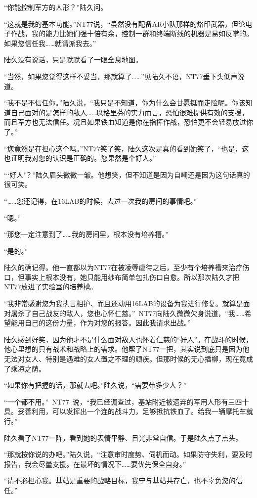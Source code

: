 “你能控制军方的人形？”陆久问。

“这就是我的基本功能。”NT77说，“虽然没有配备AR小队那样的烙印武器，但论电子作战，我的能力比她们强十倍有余，控制一群和终端断线的机器是易如反掌的。如果您信任我……就请派我去。”

陆久没有说话，只是默默看了一眼全息地图。

“当然，如果您觉得这样不妥当，那就算了……”见陆久不语，NT77垂下头低声说道。

“我不是不信任你。”陆久说，“我只是不知道，你为什么会甘愿铤而走险呢。你该知道自己面对的是怎样的敌人……以格里芬的实力而言，恐怕很难提供有效的支援，而且军方也无法信任。况且如果铁血知道是你在指挥作战，恐怕更不会轻易放过你了。”

“您竟然是在担心这个吗。”NT77笑了笑，陆久这次是真的看到她笑了，“也是，这也证明我对您的认识是正确的。您果然是个好人。”

“‘好人’？”陆久眉头微微一皱。他想笑，但不知道是因为自嘲还是因为这句话真的很可笑。

“……您还记得，在16LAB的时候，去过一次我的房间的事情吧。”

“嗯。”

“那您一定注意到了……我的房间里，根本没有培养槽。”

“是的。”

陆久的确记得。他一直都以为NT77在被凌辱虐待之后，至少有个培养槽来治疗伤口，但事实上根本没有，她只能用纱布简单包扎伤口自愈。所以那次陆久才把NT77放进了实验室的培养槽。

“我非常感谢您为我执言相护、而且还动用16LAB的设备为我进行修复。就算是面对屠杀了自己战友的敌人，您也心怀仁慈。” NT77向陆久微微欠身说道，“我……希望能用自己的这份力量，作为对您的报答。因此我请求出战。”

陆久感到好笑，因为他才不是什么面对敌人也怀着仁慈的“好人”。在战斗的时候，他心里想的只有战术和战略上的需求。他帮了NT77一把，其实说到底只是因为他无法对女人、特别是遇难的女人置之不理的顽疾。但那时候的无心插柳，现在竟成了乘凉之荫。

“如果你有把握的话，那就去吧。”陆久说，“需要带多少人？”

“一个都不用。” NT77 说，“我已经调查过，基站附近被遗弃的军用人形有三四十具。妥善利用，可以发挥出一个连的战斗力，足够抵抗铁血了。给我一辆摩托车就行。”

陆久看了NT77一阵，看到她的表情平静、目光非常自信。于是陆久点了点头。

“那就按你说的办吧。”陆久说，“注意审时度势、伺机而动。如果防守失利，要及时报告，我会尽量支援。在最坏的情况下……要优先保全自身。”

“请不必担心我。基站是重要的战略目标，我宁与基站共存亡，也不辜负您的信任。”

